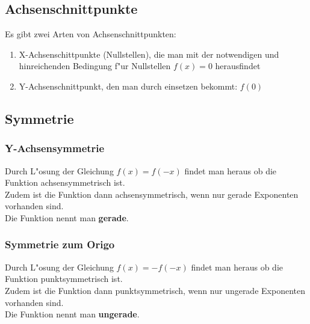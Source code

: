\subsection{Achsenschnittpunkte}

Es gibt zwei Arten von Achsenschnittpunkten:
\begin{enumerate}
\item X-Achsenschittpunkte (Nullstellen), die man mit der notwendigen und hinreichenden Bedingung f"ur Nullstellen $f(x)=0$ herausfindet
\item Y-Achsenschnittpunkt, den man durch einsetzen bekommt: $f(0)$ \\
\end{enumerate}

\subsection{Symmetrie}

\subsubsection{Y-Achsensymmetrie}

Durch L"osung der Gleichung $f(x)=f(-x)$ findet man heraus ob die Funktion achsensymmetrisch ist.\\
Zudem ist die Funktion dann achsensymmetrisch, wenn nur gerade Exponenten vorhanden sind.\\
Die Funktion nennt man \textbf{gerade}.\\

\subsubsection{Symmetrie zum Origo}

Durch L"osung der Gleichung $f(x)=-f(-x)$ findet man heraus ob die Funktion punktsymmetrisch ist.\\
Zudem ist die Funktion dann punktsymmetrisch, wenn nur ungerade Exponenten vorhanden sind.\\
Die Funktion nennt man \textbf{ungerade}.\\


